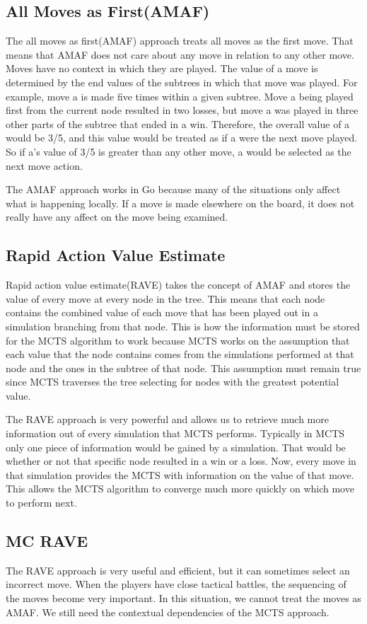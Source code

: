 \documentclass{sig-alternate}
\begin{document}
\subsection{All Moves as First(AMAF)}
The all moves as first(AMAF) approach treats all moves as the first move. That means that AMAF does not care about any move in relation to any other move. Moves have no context in which they are played. The value of a move is determined by the end values of the subtrees in which that move was played. For example, move a is made five times within a given subtree. Move a being played first from the current node resulted in two losses, but move a was played in three other parts of the subtree that ended in a win. Therefore, the overall value of a would be 3/5, and this value would be treated as if a were the next move played. So if a's value of 3/5 is greater than any other move, a would be selected as the next move action.

The AMAF approach works in Go because many of the situations only affect what is happening locally. If a move is made elsewhere on the board, it does not really have any affect on the move being examined.

\subsection{Rapid Action Value Estimate}
Rapid action value estimate(RAVE) takes the concept of AMAF and stores the value of every move at every node in the tree. This means that each node contains the combined value of each move that has been played out in a simulation branching from that node. This is how the information must be stored for the MCTS algorithm to work because MCTS works on the assumption that each value that the node contains comes from the simulations performed at that node and the ones in the subtree of that node. This assumption must remain true since MCTS traverses the tree selecting for nodes with the greatest potential value.   

The RAVE approach is very powerful and allows us to retrieve much more information out of every simulation that MCTS performs. Typically in MCTS only one piece of information would be gained by a simulation. That would be whether or not that specific node resulted in a win or a loss. Now, every move in that simulation provides the MCTS with information on the value of that move. This allows the MCTS algorithm to converge much more quickly on which move to perform next.

\subsection{MC RAVE}
The RAVE approach is very useful and efficient, but it can sometimes select an incorrect move\cite{RAVEinGo}. When the players have close tactical battles, the sequencing of the moves become very important. In this situation, we cannot treat the moves as AMAF. We still need the contextual dependencies of the MCTS approach.
\end{document}
